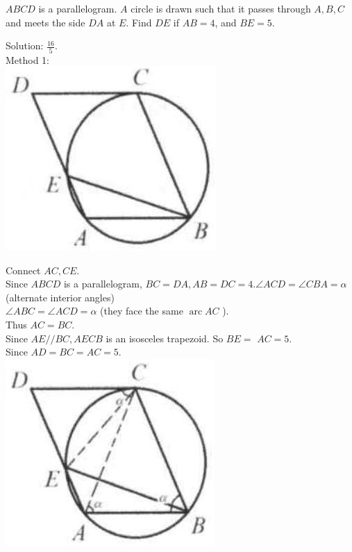 \documentclass{article}
\begin{document}
\(A B C D\) is a parallelogram. \(A\) circle is drawn such that it passes through \(A, B, C\) and meets the side \(D A\) at \(E\). Find \(D E\) if \(A B=4\), and \(B E=5\).

Solution: \(\frac{16}{5}\).\\
Method 1:\\
\centering
\includegraphics[width=\textwidth]{images/167.jpg}

Connect \(A C, C E\).\\
Since \(A B C D\) is a parallelogram, \(B C=D A, A B=D C=4 . \angle A C D=\angle C B A=\alpha\) (alternate interior angles)\\
\(\angle A B C=\angle A C D=\alpha\) (they face the same \(\operatorname{arc} A C\) ).\\
Thus \(A C=B C\).\\
Since \(A E / / B C, A E C B\) is an isosceles trapezoid. So \(B E=\) \(A C=5\).\\
Since \(A D=B C=A C=5\).\\
\centering
\includegraphics[width=\textwidth]{images/167(2).jpg}
\end{document}
